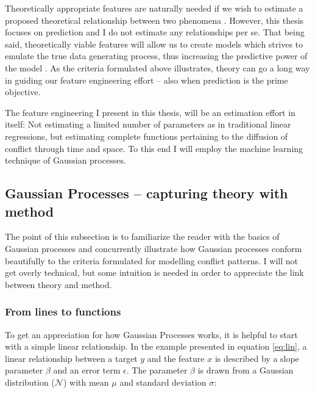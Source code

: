 \documentclass[a4paper]{article}
\begin{document}
Theoretically appropriate features are naturally needed if we wish to estimate a proposed theoretical relationship between two phenomena \citep{Blimes_2006, Cederman_Gleditsch_Buhaug_2013}. However, this thesis focuses on prediction and I do not estimate any relationships per se. That being said, theoretically viable features will allow us to create models which strives to emulate the true data generating process, thus increasing the predictive power of the model \citep[209-211]{Mcelreath_2018}. As the criteria formulated above illustrates, theory can go a long way in guiding our feature engineering effort -- also when prediction is the prime objective.\par

The feature engineering I present in this thesis, will be an estimation effort in itself: Not estimating a limited number of parameters as in traditional linear regressions, but estimating complete functions pertaining to the diffusion of conflict through time and space. To this end I will employ the machine learning technique of Gaussian processes.\par 

\subsection{Gaussian Processes -- capturing theory with method}\label{GPS}  %

The point of this subsection is to familiarize the reader with the basics of Gaussian processes and concurrently illustrate how Gaussian processes conform beautifully to the criteria formulated for modelling conflict patterns. I will not get overly technical, but some intuition is needed in order to appreciate the link between theory and method.\par

\subsubsection{From lines to functions}

To get an appreciation for how Gaussian Processes works, it is helpful to start with a simple linear relationship. In the example presented in equation \ref{eq:lin}, a linear relationship between a target $y$ and the feature $x$ is described by a slope parameter $\beta$ and an error term $\epsilon$. The parameter $\beta$ is drawn from a Gaussian distribution ($\mathcal{N}$) with mean $\mu$ and standard deviation $\sigma$:
\end{document}
